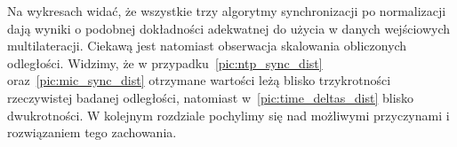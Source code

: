 Na wykresach widać, że wszystkie trzy algorytmy synchronizacji po normalizacji dają wyniki o podobnej dokładności adekwatnej do użycia w danych wejściowych multilateracji. Ciekawą jest natomiast obserwacja skalowania obliczonych odległości. Widzimy, że w przypadku~\ref{pic:ntp_sync_dist} oraz~\ref{pic:mic_sync_dist} otrzymane wartości leżą blisko trzykrotności rzeczywistej badanej odległości, natomiast w~\ref{pic:time_deltas_dist} blisko dwukrotności. W kolejnym rozdziale pochylimy się nad możliwymi przyczynami i rozwiązaniem tego zachowania.